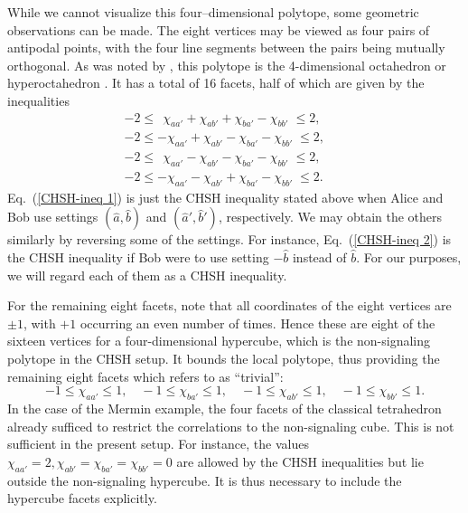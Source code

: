 While we cannot visualize this four--dimensional polytope, some geometric observations can be made. The eight vertices may be viewed as four pairs of antipodal points, with the four line segments between the pairs being mutually orthogonal. As was noted by \citet[p. 5]{Pitowsky 2008}, this polytope is the 4-dimensional octahedron or hyperoctahedron \citep[p.\ 112]{Bub 2016}. It has a total of 16 facets, half of which are given by the inequalities
\begin{eqnarray}
-2 \le \;\, \chi_{aa'} + \chi_{ab'} + \chi_{ba'} - \chi_{bb'} \; \le 2, & & \label{CHSH-ineq 1} \\[.2cm]
-2\le -\chi_{aa'}+\chi_{ab'}-\chi_{ba'}-\chi_{bb'} \; \le  2,  & & \label{CHSH-ineq 2}  \\[.2cm]
-2\le \;\, \chi_{aa'}-\chi_{ab'}-\chi_{ba'}-\chi_{bb'} \; \le  2, & & \label{CHSH-ineq 3}  \\[.2cm]
-2\le  -\chi_{aa'}-\chi_{ab'}+\chi_{ba'}-\chi_{bb'} \; \le  2. & & \label{CHSH-ineq 4}
\end{eqnarray}
Eq.\ (\ref{CHSH-ineq 1}) is just the CHSH inequality stated above when Alice and Bob use settings $(\hat{a},\hat{b})$ and $(\hat{a}',\hat{b}')$, respectively. We may obtain the others similarly by reversing some of the settings. For instance, Eq.\ (\ref{CHSH-ineq 2}) is the CHSH inequality if Bob were to use setting $-\hat{b}$ instead of $\hat{b}$. For our purposes, we will regard each of them as a CHSH inequality.

For the remaining eight facets, note that all coordinates of the eight vertices are $\pm 1$, with $+1$ occurring an even number of times. Hence these are eight of the sixteen vertices for a four-dimensional hypercube, which is the non-signaling polytope in the CHSH setup. It bounds the local polytope, thus providing the remaining eight facets which \citet[p.\ 3, Eq.\ (2)]{Pitowsky 2008} refers to as ``trivial'':
\begin{equation}
-1\leq \chi_{aa'}\leq 1,\quad -1\leq \chi_{ba'}\leq 1,\quad -1\leq \chi_{ab'}\leq 1,\quad -1\leq \chi_{bb'}\leq 1.
\end{equation}
In the case of the Mermin example, the four facets of the classical tetrahedron already sufficed to restrict the correlations to the non-signaling cube. This is not sufficient in the present setup. For instance, the values $\chi_{aa'}=2,\chi_{ab'}=\chi_{ba'}=\chi_{bb'}=0$ are allowed by the CHSH inequalities but lie outside the non-signaling hypercube. It is thus necessary to include the hypercube facets explicitly.

